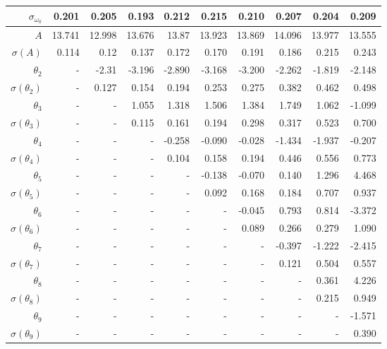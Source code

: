 \documentclass{matmex-diploma-custom}
\begin{document}
\begin{table}[h!]
\begin{tabular}{r|rrrr|r|rrrr}
 $\sigma_{\omega_0} $& 0.201       &    0.205 &    0.193 &    0.212 &   0.215 &     0.210 &    0.207 &    0.204 &    0.209 \\\hline
 $A $&13.741      &   12.998 &   13.676 &    13.87 &  13.923 &   13.869 &   14.096 &   13.977 &   13.555 \\
 $\sigma(A) $ & 0.114       &     0.12 &    0.137 &    0.172 &    0.170 &    0.191 &    0.186 &    0.215 &    0.243 \\
 $\theta_2$&-        &  -2.31 &   -3.196 &    -2.890 &  -3.168 &     -3.200 &   -2.262 &   -1.819 &   -2.148 \\
 $\sigma(\theta_2)$&-      &    0.127 &    0.154 &    0.194 &   0.253 &    0.275 &    0.382 &    0.462 &    0.498 \\
 $\theta_3$&-      &    - &   1.055 &    1.318 &   1.506 &    1.384 &    1.749 &    1.062 &   -1.099 \\
 $\sigma(\theta_3)$&-      &    - &   0.115 &    0.161 &   0.194 &    0.298 &    0.317 &    0.523 &    0.700 \\
 $\theta_4$&-      &    - &    - &  -0.258 &  -0.090 &   -0.028 &   -1.434 &   -1.937 &   -0.207 \\
 $\sigma(\theta_4)$&-      &    - &    - &     0.104 &   0.158 &    0.194 &    0.446 &    0.556 &    0.773 \\
 $\theta_5$&-      &    - &    - &    - &   -0.138 &   -0.070 &    0.140 &    1.296 &    4.468 \\
 $\sigma(\theta_5)$&-      &    - &    - &    - &    0.092 &    0.168 &    0.184 &    0.707 &    0.937 \\
 $\theta_6$&-      &    - &    - &    - &    - &    -0.045 &    0.793 &    0.814 &   -3.372 \\
 $\sigma(\theta_6)$&-    &    - &    - &    - &    - &    0.089 &    0.266 &    0.279 &    1.090 \\
 $\theta_7$&-     &    - &    - &    - &    - &    - &  -0.397 &   -1.222 &   -2.415 \\
 $ \sigma(\theta_7)$&-     &    - &    - &    - &    - &    - &      0.121 &    0.504 &    0.557 \\
 $\theta_8$&-     &    - &    - &    - &    - &    - &    - &   0.361 &    4.226 \\
 $ \sigma(\theta_8)$&-     &    - &    - &    - &    - &    - &    - &    0.215 &    0.949 \\
 $\theta_9$&-     &    - &    - &    - &    - &    - &    - &    - &  -1.571  \\
 $ \sigma(\theta_9)$&-     &    - &    - &    - &    - &    - &    - &    - &   0.390  \\
\end{tabular}
\end{table}
\end{document}
